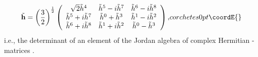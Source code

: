 \documentclass[a4paper,11pt]{article}
\begin{document}
\begin{appendix}
\begin{displaymath}
{\tilde{\mathbf{h}}=\left(\frac{3}{2}\right)^{\frac{1}{2}}\left(
\begin{array}{ccc}
\sqrt{2}{\tilde{h}}^{4}&{\tilde{h}}^{5}-i{\tilde{h}}^{7}&
{\tilde{h}}^{6}-i
{\tilde{h}}^{8}\\
{\tilde{h}}^{5}+i{\tilde{h}}^{7}&{\tilde{h}}^{0}+{\tilde{h}}^{3}&
{\tilde{h}}^{1}-i{\tilde{h}}^{2}\\
{\tilde{h}}^{6}+i{\tilde{h}}^{8}&{\tilde{h}}^{1}+i{\tilde{h}}^{2}&
{\tilde{h}}^{0}-{\tilde{h}}^{3}
\end{array}\right),
}{corchetes}{0pt}\coordE{}\end{displaymath}
i.e., the determinant of an  element \coordHE{} of the Jordan
algebra \coordHE{} of complex Hermitian \coordHE{}-matrices \cite{GST1}.

\end{appendix}
\end{document}
